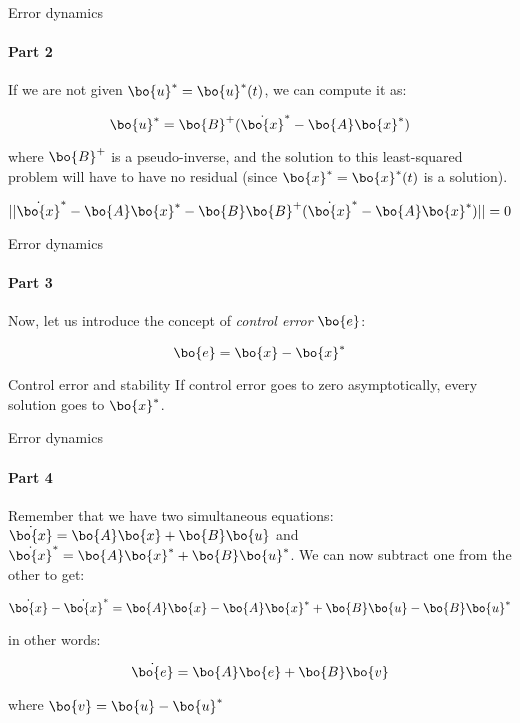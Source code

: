 \documentclass{beamer}
\begin{document}
\begin{frame}{Error dynamics}
\framesubtitle{Part 2}
\begin{flushleft}

 If we are not given $\bo{u}^* = \bo{u}^*(t)$, we can compute it as:

\begin{equation}
    \bo{u}^* = \bo{B}^+(\dot{\bo{x}}^* - \bo{A}\bo{x}^*)
\end{equation}

where $\bo{B}^+$ is a pseudo-inverse, and the solution to this least-squared problem will have to have no residual (since $\bo{x}^* = \bo{x}^*(t)$ is a solution).

\begin{equation}
   || \dot{\bo{x}}^* - \bo{A}\bo{x}^* - \bo{B}\bo{B}^+(\dot{\bo{x}}^* - \bo{A}\bo{x}^*) || = 0
\end{equation}

\end{flushleft}
\end{frame}



\begin{frame}{Error dynamics}
\framesubtitle{Part 3}
\begin{flushleft}

Now, let us introduce the concept of \emph{control error} $\bo{e}$:

\begin{equation}
    \bo{e} = \bo{x} - \bo{x}^*
\end{equation}

\begin{block}{Control error and stability}
If control error goes to zero asymptotically, every solution goes to $\bo{x}^*$.
\end{block}

\end{flushleft}
\end{frame}





\begin{frame}{Error dynamics}
\framesubtitle{Part 4}
\begin{flushleft}

Remember that we have two simultaneous equations: $\dot{\bo{x}} = \bo{A}\bo{x} + \bo{B}\bo{u}$ and $\dot{\bo{x}}^* = \bo{A}\bo{x}^* + \bo{B}\bo{u}^*$. We can now subtract one from the other to get:

\begin{equation}
    \dot{\bo{x}} - \dot{\bo{x}}^* = \bo{A}\bo{x} - \bo{A}\bo{x}^* + \bo{B}\bo{u} - \bo{B}\bo{u}^*
\end{equation}

in other words:

\begin{equation}
    \dot{\bo{e}} = \bo{A}\bo{e} + \bo{B}\bo{v}
\end{equation}

where $\bo{v} = \bo{u} - \bo{u}^*$

\end{flushleft}
\end{frame}
\end{document}
